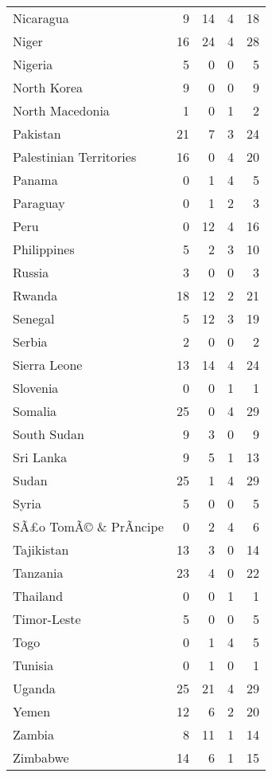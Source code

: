 \begin{longtable}[t]{lrrrr}
Nicaragua & 9 & 14 & 4 & 18\\
Niger & 16 & 24 & 4 & 28\\
Nigeria & 5 & 0 & 0 & 5\\
North Korea & 9 & 0 & 0 & 9\\
North Macedonia & 1 & 0 & 1 & 2\\
Pakistan & 21 & 7 & 3 & 24\\
Palestinian Territories & 16 & 0 & 4 & 20\\
Panama & 0 & 1 & 4 & 5\\
Paraguay & 0 & 1 & 2 & 3\\
Peru & 0 & 12 & 4 & 16\\
Philippines & 5 & 2 & 3 & 10\\
Russia & 3 & 0 & 0 & 3\\
Rwanda & 18 & 12 & 2 & 21\\
Senegal & 5 & 12 & 3 & 19\\
Serbia & 2 & 0 & 0 & 2\\
Sierra Leone & 13 & 14 & 4 & 24\\
Slovenia & 0 & 0 & 1 & 1\\
Somalia & 25 & 0 & 4 & 29\\
South Sudan & 9 & 3 & 0 & 9\\
Sri Lanka & 9 & 5 & 1 & 13\\
Sudan & 25 & 1 & 4 & 29\\
Syria & 5 & 0 & 0 & 5\\
SÃ£o TomÃ© \& PrÃ­ncipe & 0 & 2 & 4 & 6\\
Tajikistan & 13 & 3 & 0 & 14\\
Tanzania & 23 & 4 & 0 & 22\\
Thailand & 0 & 0 & 1 & 1\\
Timor-Leste & 5 & 0 & 0 & 5\\
Togo & 0 & 1 & 4 & 5\\
Tunisia & 0 & 1 & 0 & 1\\
Uganda & 25 & 21 & 4 & 29\\
Yemen & 12 & 6 & 2 & 20\\
Zambia & 8 & 11 & 1 & 14\\
Zimbabwe & 14 & 6 & 1 & 15\\
\bottomrule
\end{longtable}
\endgroup{}

